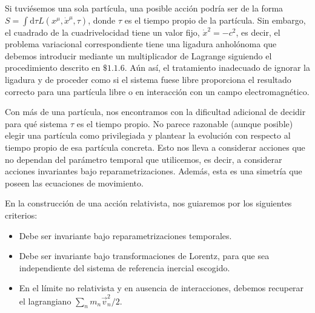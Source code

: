 Si tuviésemos una sola partícula, una posible acción podría ser de la forma $S=\int \mathrm{d} \tau L\left(x^{\mu}, \dot{x}^{\mu}, \tau\right)$, donde $\tau$ es el tiempo propio de la partícula. Sin embargo, el cuadrado de la cuadrivelocidad tiene un valor fijo, $\dot{x}^{2}=-c^{2}$, es decir, el problema variacional correspondiente tiene una ligadura anholónoma que debemos introducir mediante un multiplicador de Lagrange siguiendo el procedimiento descrito en $\$ 1.1 .6$. Aún así, el tratamiento inadecuado de ignorar la ligadura y de proceder como si el sistema fuese libre proporciona el resultado correcto para una partícula libre o en interacción con un campo electromagnético.

Con más de una partícula, nos encontramos con la dificultad adicional de decidir para qué sistema $\tau$ es el tiempo propio. No parece razonable (aunque posible) elegir una partícula como privilegiada y plantear la evolución con respecto al tiempo propio de esa partícula concreta. Esto nos lleva a considerar acciones que no dependan del parámetro temporal que utilicemos, es decir, a considerar acciones invariantes bajo reparametrizaciones. Además, esta es una simetría que poseen las ecuaciones de movimiento.

En la construcción de una acción relativista, nos guiaremos por los siguientes criterios:

\begin{itemize}
  \item  Debe ser invariante bajo reparametrizaciones temporales.
\item  Debe ser invariante bajo transformaciones de Lorentz, para que sea independiente del sistema de referencia inercial escogido.
\item  En el límite no relativista y en ausencia de interacciones, debemos recuperar el lagrangiano $\sum_{n} m_{n} \vec{v}_{n}^{2} / 2$.
\end{itemize}

